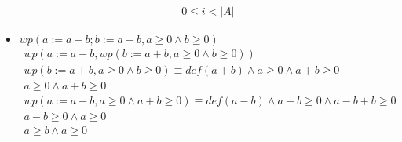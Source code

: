 \documentclass[10pt,a4paper]{article}
\begin{document}
\begin{itemize}
\begin{equation*}
\begin{gathered}
            0\leq i < |A|
        \end{gathered}
    \end{equation*}
    \item $wp(a:= a-b; b:=a+b,a\geq 0 \land b\geq 0)$
    \begin{equation*}
        \begin{gathered}
            wp(a:= a-b, wp(b:=a+b,a\geq 0 \land b\geq 0))\\
            wp(b:=a+b,a\geq 0 \land b\geq 0)\equiv def(a+b)\land a\geq0 \land a+b\geq 0\\
            a\geq0 \land a+b\geq 0
            \\
            wp(a:= a-b, a\geq0 \land a+b\geq 0)\equiv def(a-b)\land  a-b\geq0 \land a-b+b\geq 0\\
            a-b\geq 0 \land a\geq 0\\
            a\geq b \land a\geq 0
        \end{gathered}
    \end{equation*}
\end{itemize}
\pagebreak
{}
\end{document}
